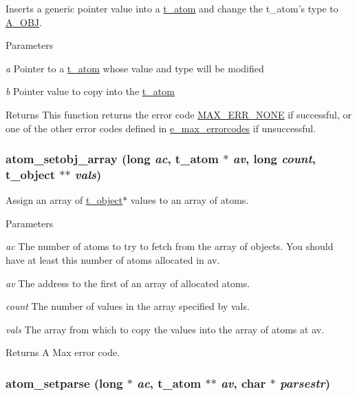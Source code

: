 Inserts a generic pointer value into a \hyperlink{structt__atom}{t\_\-atom} and change the t\_\-atom's type to \hyperlink{group__atom_gga8aa6700e9f00b132eb376db6e39ade47a82cc76e0d53c8fc28df167c35d5bbd1a}{A\_\-OBJ}. 
\begin{DoxyParams}{Parameters}
\item[{\em a}]Pointer to a \hyperlink{structt__atom}{t\_\-atom} whose value and type will be modified \item[{\em b}]Pointer value to copy into the \hyperlink{structt__atom}{t\_\-atom}\end{DoxyParams}
\begin{DoxyReturn}{Returns}
This function returns the error code \hyperlink{group__misc_gga0764dd6c02b76cca7d053ae50555d69da6d22f77fef8b1e1b074cef5d29d935fd}{MAX\_\-ERR\_\-NONE} if successful, or one of the other error codes defined in \hyperlink{group__misc_ga0764dd6c02b76cca7d053ae50555d69d}{e\_\-max\_\-errorcodes} if unsuccessful. 
\end{DoxyReturn}
\hypertarget{group__atom_ga8ebd48ccec485451687fd5b7abcd0227}{
\subsubsection[{atom\_\-setobj\_\-array}]{ atom\_\-setobj\_\-array (long {\em ac}, \/  {\bf t\_\-atom} $\ast$ {\em av}, \/  long {\em count}, \/  {\bf t\_\-object} $\ast$$\ast$ {\em vals})}}
\label{group__atom_ga8ebd48ccec485451687fd5b7abcd0227}


Assign an array of \hyperlink{structt__object}{t\_\-object}$\ast$ values to an array of atoms. 
\begin{DoxyParams}{Parameters}
\item[{\em ac}]The number of atoms to try to fetch from the array of objects. You should have at least this number of atoms allocated in av. \item[{\em av}]The address to the first of an array of allocated atoms. \item[{\em count}]The number of values in the array specified by vals. \item[{\em vals}]The array from which to copy the values into the array of atoms at av. \end{DoxyParams}
\begin{DoxyReturn}{Returns}
A Max error code. 
\end{DoxyReturn}
\hypertarget{group__atom_ga55938aedb41a8f3565680cf29169dc70}{
\subsubsection[{atom\_\-setparse}]{ atom\_\-setparse (long $\ast$ {\em ac}, \/  {\bf t\_\-atom} $\ast$$\ast$ {\em av}, \/  char $\ast$ {\em parsestr})}}
\label{group__atom_ga55938aedb41a8f3565680cf29169dc70}


